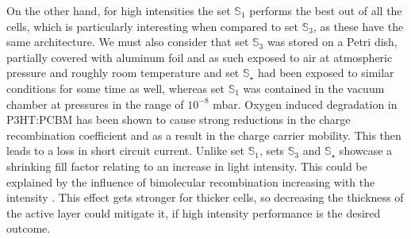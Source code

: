 \documentclass[a4paper,10pt,twocolumn]{article}
\begin{document}
\begin{extract*}
On the other hand, for high intensities the set $\mathbb{S}_1$ performs the best out of all the cells, which is particularly interesting when compared to set $\mathbb{S}_3$, as these have the same architecture. We must also consider that set $\mathbb{S}_3$ was stored on a Petri dish, partially covered with aluminum foil and as such exposed to air at atmospheric pressure and roughly room temperature and set $\mathbb{S}_\star$ had been exposed to similar conditions for some time as well, whereas set $\mathbb{S}_1$ was contained in the vacuum chamber at pressures in the range of $10^{-8}$ mbar. Oxygen induced degradation in P3HT:PCBM has been shown\cite{source14} to cause strong reductions in the charge recombination coefficient and as a result in the charge carrier mobility. This then leads to a loss in short circuit current.\mypar
Unlike set $\mathbb{S}_1$, sets $\mathbb{S}_3$ and $\mathbb{S}_\star$ showcase a shrinking fill factor relating to an increase in light intensity. This could be explained by the influence of bimolecular recombination increasing with the intensity \cite{source15}. This effect gets stronger for thicker cells, so decreasing the thickness of the active layer could mitigate it, if high intensity performance is the desired outcome.
\end{extract*}
\end{document}
